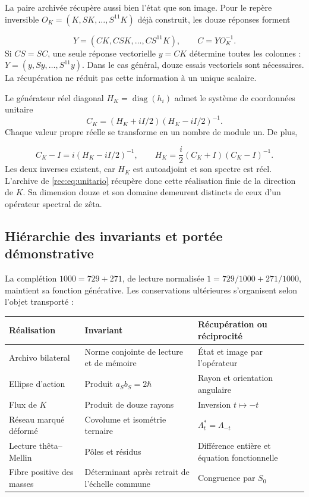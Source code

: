 La paire archivée récupère aussi bien l’état que son image. Pour le repère inversible \(O_K=(K,SK,\ldots,S^{11}K)\) déjà construit, les douze réponses forment

\[
 Y=(CK,CSK,\ldots,CS^{11}K),\qquad C=YO_K^{-1}.
\]
Si \(CS=SC\), une seule réponse vectorielle \(y=CK\) détermine toutes les colonnes : \(Y=(y,Sy,\ldots,S^{11}y)\). Dans le cas général, douze essais vectoriels sont nécessaires. La récupération ne réduit pas cette information à un unique scalaire.

Le générateur réel diagonal \(H_K=\operatorname{diag}(h_i)\) admet le système de coordonnées unitaire
\[
 C_K=(H_K+iI/2)(H_K-iI/2)^{-1}.
\]
Chaque valeur propre réelle se transforme en un nombre de module un. De plus,

\[
 C_K-I=i(H_K-iI/2)^{-1},\qquad
 H_K=\frac i2(C_K+I)(C_K-I)^{-1}.
\]
Les deux inverses existent, car \(H_K\) est autoadjoint et son spectre est réel. L'archive de \eqref{rec:eq:unitario} récupère donc cette réalisation finie de la direction de \(K\). Sa dimension douze et son domaine demeurent distincts de ceux d'un opérateur spectral de zêta.

\subsection{Hiérarchie des invariants et portée démonstrative
}

La complétion \(1000=729+271\), de lecture normalisée \(1=729/1000+271/1000\), maintient sa fonction générative. Les conservations ultérieures s’organisent selon l’objet transporté :
\begin{center}
\small
\begin{tabularx}{\linewidth}{@{}p{.27\linewidth}Xp{.25\linewidth}@{}}
\toprule
Réalisation
 & Invariant
 & Récupération ou réciprocité
\\
\midrule
Archivo bilateral & Norme conjointe de lecture et de mémoire
 & État et image par l’opérateur
\\
Ellipse d’action & Produit \(a_Sb_S=2\hbar\) & Rayon et orientation angulaire
\\
Flux de \(K\) & Produit de douze rayons
 & Inversion \(t\mapsto-t\)\\
Réseau marqué déformé & Covolume et isométrie ternaire
 & \(\Lambda_t^*=\Lambda_{-t}\)\\
Lecture thêta--Mellin & Pôles et résidus & Différence entière et équation fonctionnelle
\\
Fibre positive des masses & Déterminant après retrait de l’échelle commune & Congruence par \(S_0\)
\\
\bottomrule
\end{tabularx}
\end{center}

